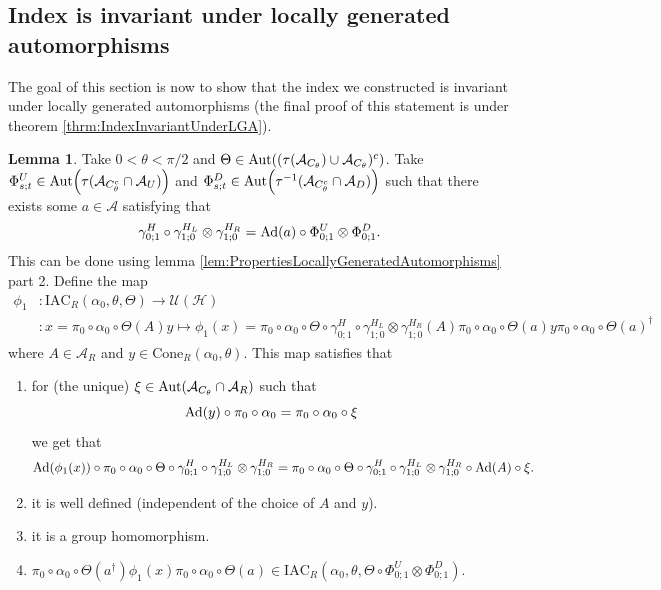\documentclass[12pt,a4paper,twoside]{article}
\newcommand{\IAC}{\textrm{IAC}}
\let\originalleft\left
\let\originalright\right
\renewcommand{\left}{\mathopen{}\mathclose\bgroup\originalleft}
\renewcommand{\right}{\aftergroup\egroup\originalright}
\newcommand{\UU}{\mathcal U}
\newcommand{\HH}{\mathcal H}
\renewcommand{\AA}{\mathcal A}
\newcommand{\Ad}[1]{\textrm{Ad}\left(#1\right)}
\newcommand{\Aut}[1]{\textrm{Aut}\left(#1\right)}
\theoremstyle{definition}
\newtheorem{lemma}[theorem]{Lemma}
\numberwithin{equation}{section}
\begin{document}
\subsection{Index is invariant under locally generated automorphisms}\label{sec:IndexInvariantUnderLGA}
The goal of this section is now to show that the index we constructed is invariant under locally generated automorphisms (the final proof of this statement is under theorem \ref{thrm:IndexInvariantUnderLGA}).
\begin{lemma}\label{lem:DefinitionOfGroupMorphism}
	Take $0<\theta<\pi/2$ and $\Theta\in \Aut{(\tau(\AA_{C_\theta})\cup\AA_{C_\theta})^c}$. Take $\Phi^U_{s;t}\in\Aut{\tau(\AA_{C_\theta^c}\cap\AA_{U})}$ and $\Phi^D_{s;t}\in\Aut{\tau^{-1}(\AA_{C_\theta^c}\cap\AA_{D})}$ such that there exists some $a\in\AA$ satisfying that
	\begin{equation}\label{eq:DefinitionOfGroupMorphismHAutEquation}
		\gamma^H_{0;1}\circ\gamma^{H_L}_{1;0}\otimes\gamma^{H_R}_{1;0}=\Ad{a}\circ \Phi^U_{0;1}\otimes\Phi^D_{0;1}.
	\end{equation}
	This can be done using lemma \ref{lem:PropertiesLocallyGeneratedAutomorphisms} part 2. Define the map
	\begin{align}
		\phi_1&:\IAC_R(\alpha_0,\theta,\Theta) \rightarrow \UU(\HH)\\
		\nonumber
		&:x=\pi_0\circ\alpha_0\circ\Theta(A)y\mapsto \phi_1(x)=\pi_0\circ\alpha_0\circ\Theta\circ\gamma^H_{0;1}\circ\gamma^{H_L}_{1;0}\otimes\gamma^{H_R}_{1;0}(A)\pi_0\circ\alpha_0\circ\Theta(a)y\pi_0\circ\alpha_0\circ\Theta(a)^\dagger
	\end{align}
	where $A\in\AA_R$ and $y\in\textrm{Cone}_R(\alpha_0,\theta)$. This map satisfies that
	\begin{enumerate}
		\item  for (the unique) $\xi\in\Aut{\AA_{C_\theta}\cap\AA_R}$ such that
		\begin{equation}
			\Ad{y}\circ\pi_0\circ\alpha_0=\pi_0\circ\alpha_0\circ\xi
		\end{equation}
		we get that
		\begin{equation}\label{eq:ConditionDefinitionOfGroupMorphism}
			\Ad{\phi_1(x)}\circ\pi_0\circ\alpha_0\circ\Theta\circ\gamma^H_{0;1}\circ\gamma^{H_L}_{1;0}\otimes\gamma^{H_R}_{1;0}=\pi_0\circ\alpha_0\circ\Theta\circ\gamma^H_{0;1}\circ\gamma^{H_L}_{1;0}\otimes\gamma^{H_R}_{1;0}\circ\Ad{A}\circ\xi.
		\end{equation}
		\item it is well defined (independent of the choice of $A$ and $y$).
		\item it is a group homomorphism.
		\item $\pi_0\circ\alpha_0\circ\Theta(a^\dagger)\phi_1(x)\pi_0\circ\alpha_0\circ\Theta(a)\in\IAC_R(\alpha_0,\theta,\Theta\circ \Phi^U_{0;1}\otimes\Phi^D_{0;1})$.
	\end{enumerate}
\end{lemma}
\end{document}
